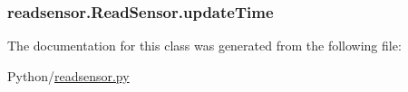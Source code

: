 \subsubsection[{\texorpdfstring{update\+Time}{updateTime}}]{\setlength{\rightskip}{0pt plus 5cm}readsensor.\+Read\+Sensor.\+update\+Time}\hypertarget{classreadsensor_1_1ReadSensor_adb42967437e88c29257d8fa7e6dcd8e2}{}\label{classreadsensor_1_1ReadSensor_adb42967437e88c29257d8fa7e6dcd8e2}


The documentation for this class was generated from the following file\+:\begin{DoxyCompactItemize}
\item 
Python/\hyperlink{readsensor_8py}{readsensor.\+py}\end{DoxyCompactItemize}
